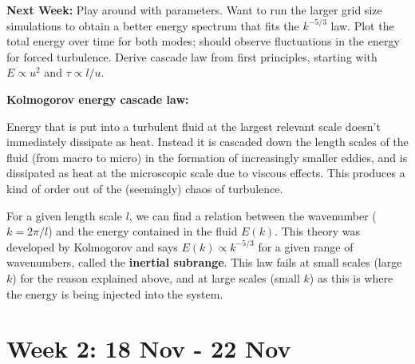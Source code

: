 \documentclass[12pt,letterpaper]{article}
\begin{document}
\textbf{Next Week:} Play around with parameters. Want to run the larger grid size simulations to obtain a better energy spectrum that fits the $k^{-5/3}$ law. Plot the total energy over time for both modes; should observe fluctuations in the energy for forced turbulence. Derive cascade law from first principles, starting with $E\propto u^2$ and $\tau \propto l/u$.

\hypertarget{Kolmogorov}{\textbf{Kolmogorov energy cascade law:}} Energy that is put into a turbulent fluid at the largest relevant scale doesn't immediately dissipate as heat. Instead it is cascaded down the length scales of the fluid (from macro to micro) in the formation of increasingly smaller eddies, and is dissipated as heat at the microscopic scale due to viscous effects. This produces a kind of order out of the (seemingly) chaos of turbulence.

For a given length scale $l$, we can find a relation between the wavenumber ($k=2\pi/l$) and the energy contained in the fluid $E(k)$. This theory was developed by Kolmogorov and says $E(k)\propto k^{-5/3}$ for a given range of wavenumbers, called the \textbf{inertial subrange}. This law fails at small scales (large $k$) for the reason explained above, and at large scales (small $k$) as this is where the energy is being injected into the system.

\section*{Week 2: 18 Nov - 22 Nov}
\end{document}
